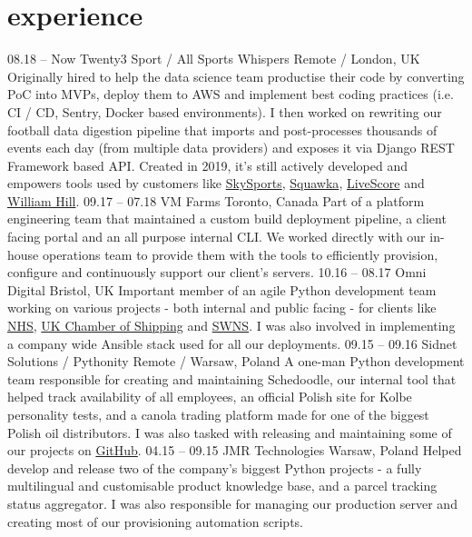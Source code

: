 \documentclass[]{cv-style}          %
\begin{document}
\section{experience}
  \vspace{-0.3cm}

\begin{entrylist}
\entry
  {08.18 -- Now}
  {Twenty3 Sport / All Sports Whispers}
  {Remote / London, UK}
  {Originally hired to help the data science team productise their code by converting PoC into MVPs, deploy them to AWS and implement best coding practices (i.e. CI / CD, Sentry, Docker based environments). I then worked on rewriting our football data digestion pipeline that imports and post-processes thousands of events each day (from multiple data providers) and exposes it via Django REST Framework based API. Created in 2019, it's still actively developed and empowers tools used by customers like \href{https://www.skysports.com/}{SkySports}, \href{https://www.squawka.com/}{Squawka}, \href{https://www.livescore.com/}{LiveScore} and \href{https://www.williamhill.com/}{William Hill}.}
\entry
  {09.17 -- 07.18}
  {VM Farms}
  {Toronto, Canada}
  {Part of a platform engineering team that maintained a custom build deployment pipeline, a client facing portal and an all purpose internal CLI. We worked directly with our in-house operations team to provide them with the tools to efficiently provision, configure and continuously support our client's servers.}
\entry
  {10.16 -- 08.17}
  {Omni Digital}
  {Bristol, UK}
  {Important member of an agile Python development team working on various projects - both internal and public facing - for clients like \href{https://www.bristolccg.nhs.uk/}{NHS}, \href{https://www.ukchamberofshipping.com/}{UK Chamber of Shipping} and \href{http://swns.com/}{SWNS}. I was also involved in implementing a company wide Ansible stack used for all our deployments.}
\entry
  {09.15 -- 09.16}
  {Sidnet Solutions / Pythonity}
  {Remote / Warsaw, Poland}
  {A one-man Python development team responsible for creating and maintaining Schedoodle, our internal tool that helped track availability of all employees, an official Polish site for Kolbe personality tests, and a canola trading platform made for one of the biggest Polish oil distributors. I was also tasked with releasing and maintaining some of our projects on \href{https://github.com/Pythonity}{GitHub}.}
\entry
  {04.15 -- 09.15}
  {JMR Technologies}
  {Warsaw, Poland}
  {Helped develop and release two of the company's biggest Python projects - a fully multilingual and customisable product knowledge base, and a parcel tracking status aggregator. I was also responsible for managing our production server and creating most of our provisioning automation scripts.}
\end{entrylist}
\end{document}
